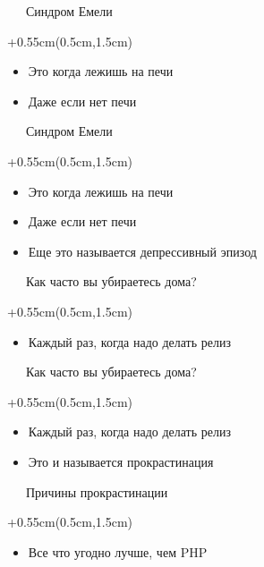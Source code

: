 \documentclass[xetex,18pt,aspectratio=169]{beamer}
\begin{document}
\begin{Large}
\begin{frame}{\ \ \ Синдром Емели}
\begin{textblock*}{\framewidth+0.55cm}(0.5cm,1.5cm)
\begin{itemize}
  \item Это когда лежишь на печи
  \item Даже если нет печи
\end{itemize}
\end{textblock*}
\end{frame}

\begin{frame}{\ \ \ Синдром Емели}
\begin{textblock*}{\framewidth+0.55cm}(0.5cm,1.5cm)
\begin{itemize}
  \item Это когда лежишь на печи
  \item Даже если нет печи
  \item Еще это называется депрессивный эпизод
\end{itemize}
\end{textblock*}
\end{frame}

\begin{frame}{\ \ \ Как часто вы убираетесь дома?}
\begin{textblock*}{\framewidth+0.55cm}(0.5cm,1.5cm)
\begin{itemize}
  \item Каждый раз, когда надо делать релиз
\end{itemize}
\end{textblock*}
\end{frame}

\begin{frame}{\ \ \ Как часто вы убираетесь дома?}
\begin{textblock*}{\framewidth+0.55cm}(0.5cm,1.5cm)
\begin{itemize}
  \item Каждый раз, когда надо делать релиз
  \item Это и называется прокрастинация
\end{itemize}
\end{textblock*}
\end{frame}

\begin{frame}{\ \ \ Причины прокрастинации}
\begin{textblock*}{\framewidth+0.55cm}(0.5cm,1.5cm)
\begin{itemize}
  \item Все что угодно лучше, чем PHP
\end{itemize}
\end{textblock*}
\end{frame}


\end{Large}
\end{document}
